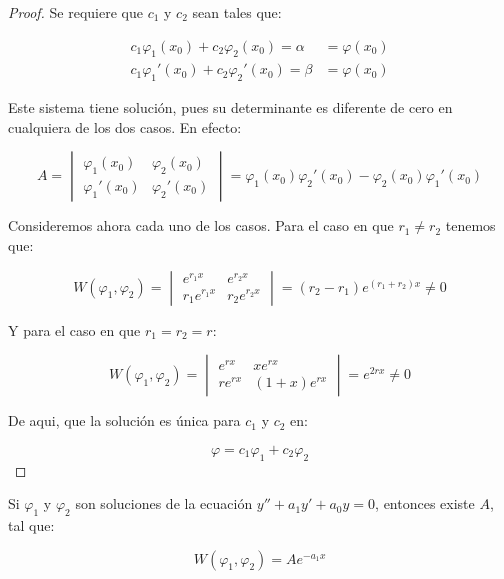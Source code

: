 		\begin{proof}
			Se requiere que $c_1$ y $c_2$ sean tales que:

			\begin{align*}
				c_1 \varphi_1(x_0) + c_2 \varphi_2(x_0) = \alpha &= \varphi(x_0) \\
				c_1 \varphi_1'(x_0) + c_2 \varphi_2'(x_0) = \beta &= \varphi(x_0)
			\end{align*}

			Este sistema tiene solución, pues su determinante es diferente de cero en cualquiera de los dos casos.
			En efecto:

			\begin{equation*}
				A =
				\begin{vmatrix}
					\varphi_1(x_0) & \varphi_2(x_0) \\
					\varphi_1'(x_0) & \varphi_2'(x_0)
				\end{vmatrix} = \varphi_1(x_0) \varphi_2'(x_0) - \varphi_2(x_0) \varphi_1'(x_0)
			\end{equation*}

			Consideremos ahora cada uno de los casos.
			Para el caso en que $r_1 \ne r_2$ tenemos que:

			\begin{equation*}
				W(\varphi_1, \varphi_2) =
				\begin{vmatrix}
					e^{r_1 x} & e^{r_2 x} \\
					r_1 e^{r_1 x} & r_2 e^{r_2 x}
				\end{vmatrix} = (r_2 - r_1) e^{(r_1 + r_2) x} \ne 0
			\end{equation*}

			Y para el caso en que $r_1 = r_2 = r$:

			\begin{equation*}
				W(\varphi_1, \varphi_2) =
				\begin{vmatrix}
					e^{r x} & x e^{r x} \\
					r e^{r x} & (1 + x) e^{r x}
				\end{vmatrix} = e^{2 r x} \ne 0
			\end{equation*}

			De aqui, que la solución es única para $c_1$ y $c_2$ en:

			\begin{equation*}
				\varphi = c_1 \varphi_1 + c_2 \varphi_2
			\end{equation*}
		\end{proof}

		\begin{proposicion}
			Si $\varphi_1$ y $\varphi_2$ son soluciones de la ecuación $y'' + a_1 y' + a_0 y = 0$, entonces existe $A$, tal que:

			\begin{equation}
				W(\varphi_1, \varphi_2) = A e^{-a_1 x}
			\end{equation}
		\end{proposicion}

